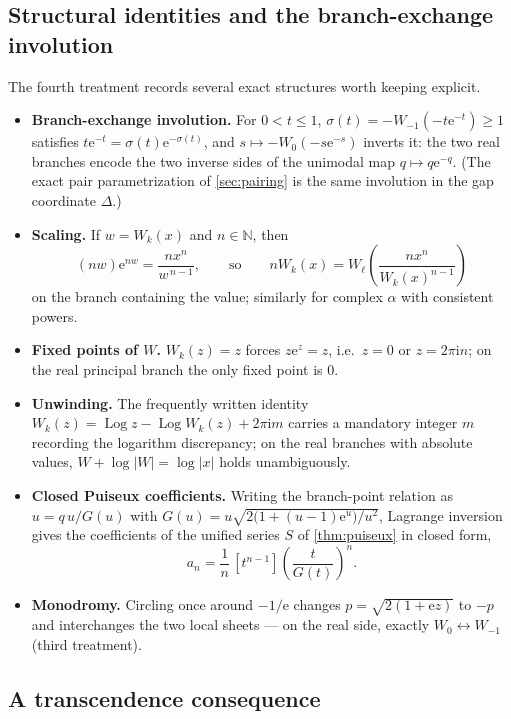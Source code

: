 \documentclass[11pt]{article}
\theoremstyle{remark}
\newcommand{\ee}{\mathrm e}
\newcommand{\ii}{\mathrm i}
\newcommand{\N}{\mathbb N}
\newcommand{\Log}{\operatorname{Log}}
\newcommand{\abs}[1]{\left|#1\right|}
\begin{document}
\subsection{Structural identities and the branch-exchange involution}

The fourth treatment records several exact structures worth keeping
explicit.

\begin{itemize}
\item\textbf{Branch-exchange involution.}  For \(0<t\le1\),
\(\sigma(t)=-W_{-1}(-t\ee^{-t})\ge1\) satisfies
\(t\ee^{-t}=\sigma(t)\ee^{-\sigma(t)}\), and
\(s\mapsto-W_0(-s\ee^{-s})\) inverts it: the two real branches encode the
two inverse sides of the unimodal map \(q\mapsto q\ee^{-q}\).  (The exact
pair parametrization of \cref{sec:pairing} is the same involution in the
gap coordinate \(\Delta\).)
\item\textbf{Scaling.}  If \(w=W_k(x)\) and \(n\in\N\), then
\[
 (nw)\ee^{nw}=\frac{nx^n}{w^{\,n-1}},
 \qquad\text{so}\qquad
 nW_k(x)=W_\ell\!\left(\frac{nx^n}{W_k(x)^{n-1}}\right)
\]
on the branch containing the value; similarly for complex \(\alpha\) with
consistent powers.
\item\textbf{Fixed points of \(W\).}  \(W_k(z)=z\) forces \(z\ee^z=z\),
i.e.\ \(z=0\) or \(z=2\pi\ii n\); on the real principal branch the only
fixed point is \(0\).
\item\textbf{Unwinding.}  The frequently written identity
\(W_k(z)=\Log z-\Log W_k(z)+2\pi\ii m\) carries a mandatory integer \(m\)
recording the logarithm discrepancy; on the real branches with absolute
values, \(W+\log\abs W=\log\abs x\) holds unambiguously.
\item\textbf{Closed Puiseux coefficients.}  Writing the branch-point
relation as \(u=q\,u/G(u)\) with
\(G(u)=u\sqrt{2\bigl(1+(u-1)\ee^u\bigr)/u^2}\), Lagrange inversion gives
the coefficients of the unified series \(S\) of \cref{thm:puiseux} in
closed form,
\begin{equation}\label{cmp:eq:puiseux-lagrange}
 a_n=\frac1n\,[t^{n-1}]\left(\frac t{G(t)}\right)^{\!n}.
\end{equation}
\item\textbf{Monodromy.}  Circling once around \(-1/\ee\) changes
\(p=\sqrt{2(1+\ee z)}\) to \(-p\) and interchanges the two local sheets ---
on the real side, exactly \(W_0\leftrightarrow W_{-1}\) (third treatment).
\end{itemize}

\subsection{A transcendence consequence}
\end{document}
